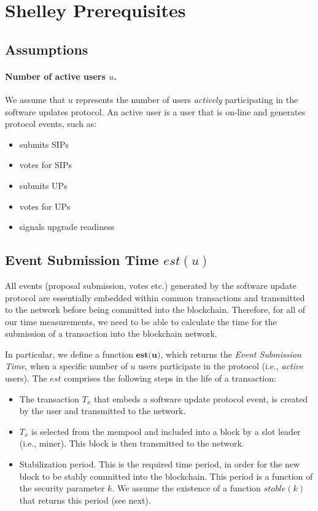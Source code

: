 \section{Shelley Prerequisites}\label{shelley}

\subsection{Assumptions}
\paragraph{Number of active users $u$.}
We assume that $u$ represents the number of users \emph{actively} participating in the software updates protocol. An active user is a user that is on-line and generates protocol events, such as: 
\begin{itemize}
\item submits SIPs
\item votes for SIPs
\item submits UPs
\item votes for UPs
\item signals upgrade readiness
\end{itemize}

\subsection{Event Submission Time $est(u)$}
All events (proposal submission, votes etc.) generated by the software update protocol are essentially embedded within common transactions and transmitted to the network before being committed into the blockchain. Therefore, for all of our time measurements, we need to be able to calculate the time for the submission of a transaction into the blockchain network. 

In particular, we define a function $\textbf{est(u)}$, which returns the \emph{Event Submission Time}, when a specific number of $u$ users participate in the protocol (i.e., \emph{active} users). The $est$ comprises the following steps in the life of a transaction:
\begin{itemize}
\item The transaction $T_x$ that embeds a software update protocol event, is created by the user and transmitted to the network.
\item $T_x$ is selected from the mempool and included into a block by a slot leader (i.e., miner). This block is then transmitted to the network.
\item Stabilization period. This is the required time period, in order for the new block to be stably committed into the blockchain. This period is a function of the security parameter $k$. We assume the existence of a function $stable(k)$ that returns this period (see next). 
\end{itemize}

